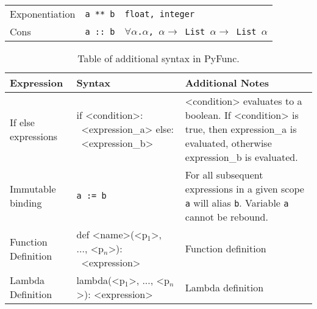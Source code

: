 \documentclass{l4proj}
\begin{document}
\begin{table}[h!]
\begin{center}
\begin{tabular}{@{}|l|l|l|@{}}
    Exponentiation        & \texttt{a ** b}       &   \texttt{float, integer} \\
    Cons                  & \texttt{a :: b}       &   \texttt{$\forall \alpha$.$\alpha$, $\alpha \rightarrow$ List $\alpha \rightarrow$ List $\alpha$} \\
    \hline
    \end{tabular}
    \end{center}
\end{table}


\begin{table}[!h]
    \caption{Table of additional syntax in PyFunc.}
    \begin{center}

    \begin{tabular}{@{}|l|p{5cm}|p{4cm}|@{}}
        \hline
        \textbf{Expression}  &   \textbf{Syntax}     &   \textbf{Additional Notes}   \\
        \hline
        \hline
        If else expressions & if <condition>: \newline \-\ <expression\_a> \newline else: \newline \-\ <expression\_b> & <condition> evaluates to a boolean. If <condition> is true, then expression\_a is evaluated, otherwise expression\_b is evaluated.\\
        \hline
        Immutable binding   & \texttt{a := b}   & For all subsequent expressions in a given scope \texttt{a} will alias \texttt{b}. Variable \texttt{a} cannot be rebound. \\
        \hline
        Function Definition & def <name>(<p$_1$>, ..., <p$_n$>): \newline \-\ <expression> & Function definition\\
        \hline
        Lambda Definition & lambda(<p$_1$>, ..., <p$_n$>): <expression> & Lambda definition \\
        \hline
        
    \end{tabular}
    \end{center}
\end{table}
\end{document}
